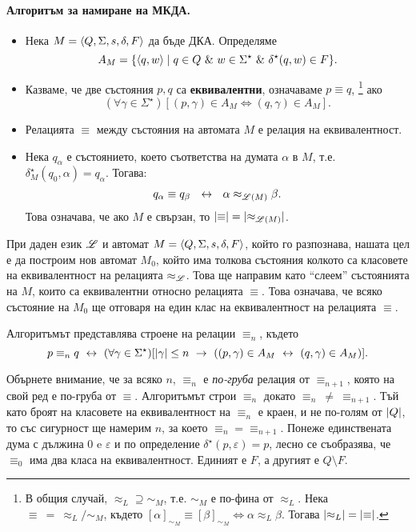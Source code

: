 \paragraph{Алгоритъм за намиране на МКДА.}
\begin{itemize}
\item
  Нека $M = \langle{Q,\Sigma,s,\delta,F}\rangle$ да бъде ДКА. Определяме
  \[A_M = \{\pair{q,w} \mid q\in Q\ \&\ w\in\Sigma^\star\ \&\ \delta^\star(q,w) \in F\}.\]
\item
  Казваме, че две състояния $p,q$ са {\bf еквивалентни}, означаваме $p\equiv q$,
  \footnote{В общия случай, $\approx_L \supseteq \sim_M$, т.е. $\sim_M$ е по-фина от $\approx_L$.
    Нека $\equiv\ =\  \approx_L/\sim_M$, където $[\alpha]_{\sim_M} \equiv [\beta]_{\sim_M} \iff \alpha \approx_L \beta$. Тогава $\vert{\approx_L}\vert = \vert{\equiv}\vert$.}
  ако \[(\forall \gamma\in \Sigma^\star)[(p,\gamma) \in A_M \iff (q,\gamma) \in A_M].\]
\item
  Релацията $\equiv$ между състояния на автомата $M$ е релация на еквивалентност. 
\item
  Нека $q_\alpha$ е състоянието, което съответства на думата $\alpha$ в $M$, т.е.
  $\delta^\star_M(q_0,\alpha) = q_\alpha$. Тогава:
  \[q_\alpha \equiv q_\beta\ \iff\ \alpha\approx_{\Ls(M)} \beta.\]
  Това означава, че ако $M$ е свързан, то $\vert{\equiv}\vert = \vert{\approx_{\mathscr{L}(M)}}\vert$.
\end{itemize}

При даден език $\mathscr{L}$ и автомат $M = \langle{Q,\Sigma,s,\delta,F}\rangle$, който го разпознава, нашата цел е да построим нов автомат $M_0$,
който има толкова състояния колкото са класовете на еквивалентност на релацията $\approx_{\mathscr{L}}$.
Това ще направим като ``слеем'' състоянията на $M$, които са еквивалентни относно релацията $\equiv$.
Това означава, че всяко състояние на $M_0$ ще отговаря на един клас на еквивалентност на релацията $\equiv$.

Алгоритъмът представлява строене на релации $\equiv_n$, където
\[p\equiv_n q \iff (\forall\gamma\in\Sigma^\star)[\abs{\gamma}\leq n\ \rightarrow\ ((p,\gamma)\in A_M \iff 
(q,\gamma) \in A_M)].\]

Обърнете внимание, че за всяко $n$, $\equiv_n$ е {\em по-груба} релация от $\equiv_{n+1}$, 
която на свой ред е по-груба от $\equiv$.
Алгоритъмът строи $\equiv_n$ докато $\equiv_n\ \neq\ \equiv_{n+1}$.
Тъй като броят на класовете на еквивалентност на $\equiv_n$ е краен, и не по-голям от $\vert{Q}\vert$, то 
със сигурност ще намерим $n$, за което $\equiv_n = \equiv_{n+1}$.
Понеже единствената дума с дължина $0$ e $\varepsilon$ и по определение $\delta^\star(p,\varepsilon) = p$, 
лесно се съобразява, че $\equiv_0$ има два класа на еквивалентност.
Единият е $F$, а другият е $Q\setminus F$.

